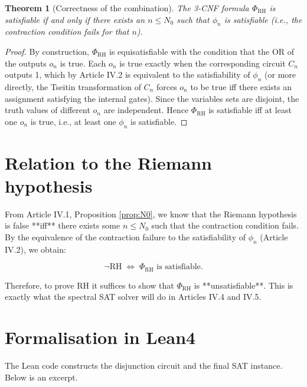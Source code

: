 \documentclass[11pt,a4paper]{article}
\newtheorem{theorem}{Theorem}[section]
\begin{document}
\begin{theorem}[Correctness of the combination]
\label{thm:combination}
The 3‑CNF formula \(\Phi_{\text{RH}}\) is satisfiable if and only if there exists an \(n \le N_0\) such that \(\phi_n\) is satisfiable (i.e., the contraction condition fails for that \(n\)).
\end{theorem}
\begin{proof}
By construction, \(\Phi_{\text{RH}}\) is equisatisfiable with the condition that the OR of the outputs \(o_n\) is true. Each \(o_n\) is true exactly when the corresponding circuit \(C_n\) outputs 1, which by Article IV.2 is equivalent to the satisfiability of \(\phi_n\) (or more directly, the Tseitin transformation of \(C_n\) forces \(o_n\) to be true iff there exists an assignment satisfying the internal gates). Since the variables sets are disjoint, the truth values of different \(o_n\) are independent. Hence \(\Phi_{\text{RH}}\) is satisfiable iff at least one \(o_n\) is true, i.e., at least one \(\phi_n\) is satisfiable.
\end{proof}

\section{Relation to the Riemann hypothesis}

From Article IV.1, Proposition \ref{prop:N0}, we know that the Riemann hypothesis is false **iff** there exists some \(n \le N_0\) such that the contraction condition fails. By the equivalence of the contraction failure to the satisfiability of \(\phi_n\) (Article IV.2), we obtain:

\[
\neg \text{RH} \;\Longleftrightarrow\; \Phi_{\text{RH}} \text{ is satisfiable}.
\]

Therefore, to prove RH it suffices to show that \(\Phi_{\text{RH}}\) is **unsatisfiable**. This is exactly what the spectral SAT solver will do in Articles IV.4 and IV.5.

\section{Formalisation in Lean4}

The Lean code constructs the disjunction circuit and the final SAT instance. Below is an excerpt.
\end{document}
